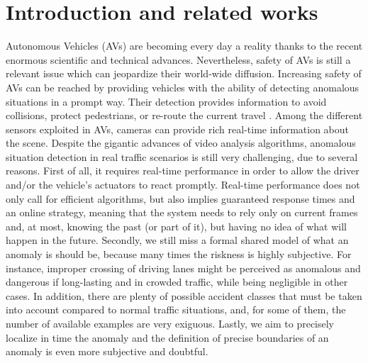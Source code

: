 \section{Introduction and related works}

Autonomous Vehicles (AVs) are becoming every day a reality thanks to the recent enormous scientific and technical advances.
Nevertheless, safety of AVs is still a relevant issue which can jeopardize their world-wide diffusion.
Increasing safety of AVs can be reached by providing vehicles with the ability of detecting anomalous situations in a prompt way.
Their detection provides information to avoid collisions, protect pedestrians, or re-route the current travel \cite{4298901}.
Among the different sensors exploited in AVs, cameras can provide rich real-time information about the scene.
Despite the gigantic advances of video analysis algorithms, anomalous situation detection in real traffic scenarios is still very challenging, due to several reasons.
First of all, it requires real-time performance in order to allow the driver and/or the vehicle's actuators to react promptly.
Real-time performance does not only call for efficient algorithms, but also implies guaranteed response times and an online strategy, meaning that the system needs to rely only on current frames and, at most, knowing the past (or part of it), but having no idea of what will happen in the future.
Secondly, we still miss a formal shared model of what an anomaly is should be, because many times the riskness is highly subjective.
For instance, improper crossing of driving lanes might be perceived as anomalous and dangerous if long-lasting and in crowded traffic, while being negligible in other cases.
In addition, there are plenty of possible accident classes that must be taken into account compared to normal traffic situations, and, for some of them, the number of available examples are very exiguous.
Lastly, we aim to precisely localize in time the anomaly and the definition of precise boundaries of an anomaly is even more subjective and doubtful.
